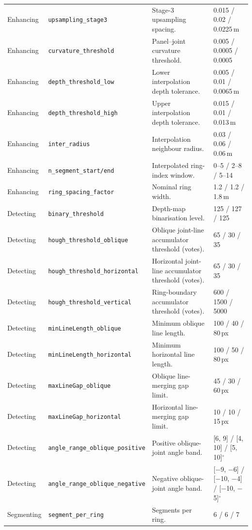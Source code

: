 \documentclass[a4paper,fleqn]{cas-dc}
\begin{document}
\begin{table}[t]
\begin{tabular*}{\textwidth}{@{\extracolsep{\fill}} l l L{0.30\textwidth} l @{}}
Enhancing & \texttt{upsampling\_stage3} & Stage-3 upsampling spacing. & 0.015 / 0.02 / 0.0225\,m \\
Enhancing & \texttt{curvature\_threshold} & Panel--joint curvature threshold. & 0.005 / 0.0005 / 0.0005 \\
Enhancing & \texttt{depth\_threshold\_low} & Lower interpolation depth tolerance. & 0.005 / 0.01 / 0.0065\,m \\
Enhancing & \texttt{depth\_threshold\_high} & Upper interpolation depth tolerance. & 0.015 / 0.01 / 0.013\,m \\
Enhancing & \texttt{inter\_radius} & Interpolation neighbour radius. & 0.03 / 0.06 / 0.06\,m \\
Enhancing & \texttt{n\_segment\_start/end} & Interpolated ring-index window. & 0--5 / 2--8 / 5--14 \\
Enhancing & \texttt{ring\_spacing\_factor} & Nominal ring width. & 1.2 / 1.2 / 1.8\,m \\
\midrule
Detecting & \texttt{binary\_threshold} & Depth-map binarisation level. & 125 / 127 / 125 \\
Detecting & \texttt{hough\_threshold\_oblique} & Oblique joint-line accumulator threshold (votes). & 65 / 30 / 35 \\
Detecting & \texttt{hough\_threshold\_horizontal} & Horizontal joint-line accumulator threshold (votes). & 65 / 30 / 35 \\
Detecting & \texttt{hough\_threshold\_vertical} & Ring-boundary accumulator threshold (votes). & 600 / 1500 / 5000 \\
Detecting & \texttt{minLineLength\_oblique} & Minimum oblique line length. & 100 / 40 / 80\,px \\
Detecting & \texttt{minLineLength\_horizontal} & Minimum horizontal line length. & 100 / 50 / 80\,px \\
Detecting & \texttt{maxLineGap\_oblique} & Oblique line-merging gap limit. & 45 / 30 / 60\,px \\
Detecting & \texttt{maxLineGap\_horizontal} & Horizontal line-merging gap limit. & 10 / 10 / 15\,px \\
Detecting & \texttt{angle\_range\_oblique\_positive} & Positive oblique-joint angle band. & [6, 9] / [4, 10] / [5, 10]$^{\circ}$ \\
Detecting & \texttt{angle\_range\_oblique\_negative} & Negative oblique-joint angle band. & [$-$9, $-$6] / [$-$10, $-$4] / [$-$10, $-$5]$^{\circ}$ \\
\midrule
Segmenting & \texttt{segment\_per\_ring} & Segments per ring. & 6 / 6 / 7 \\

\end{tabular*}
\end{table}
\end{document}
